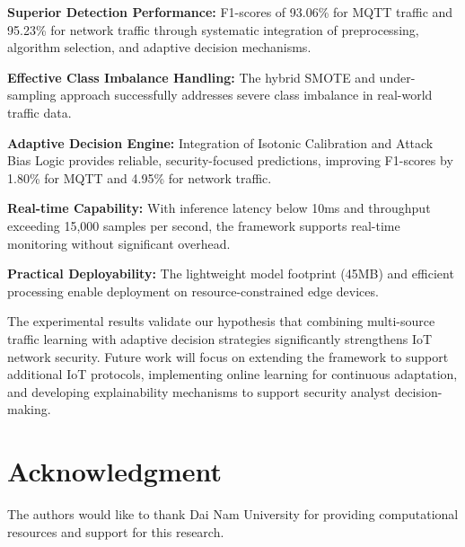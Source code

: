 \documentclass[conference]{IEEEtran}
\begin{document}
\textbf{Superior Detection Performance:} F1-scores of 93.06\% for MQTT traffic and 95.23\% for network traffic through systematic integration of preprocessing, algorithm selection, and adaptive decision mechanisms.

\textbf{Effective Class Imbalance Handling:} The hybrid SMOTE and under-sampling approach successfully addresses severe class imbalance in real-world traffic data.

\textbf{Adaptive Decision Engine:} Integration of Isotonic Calibration and Attack Bias Logic provides reliable, security-focused predictions, improving F1-scores by 1.80\% for MQTT and 4.95\% for network traffic.

\textbf{Real-time Capability:} With inference latency below 10ms and throughput exceeding 15,000 samples per second, the framework supports real-time monitoring without significant overhead.

\textbf{Practical Deployability:} The lightweight model footprint (45MB) and efficient processing enable deployment on resource-constrained edge devices.

The experimental results validate our hypothesis that combining multi-source traffic learning with adaptive decision strategies significantly strengthens IoT network security. Future work will focus on extending the framework to support additional IoT protocols, implementing online learning for continuous adaptation, and developing explainability mechanisms to support security analyst decision-making.

\section*{Acknowledgment}

The authors would like to thank Dai Nam University for providing computational resources and support for this research.
\end{document}

